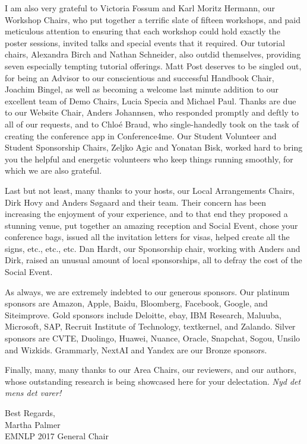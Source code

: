 I am also very grateful to Victoria Fossum and Karl Moritz Hermann, our Workshop Chairs, who put together a terrific slate of fifteen workshops, and paid meticulous attention to ensuring that each workshop could hold exactly the poster sessions, invited talks and special events that it required.  Our tutorial chairs, Alexandra Birch and Nathan Schneider, also outdid themselves, providing seven especially tempting tutorial offerings.  Matt Post deserves to be singled out, for being an Advisor to our conscientious and successful Handbook Chair, Joachim Bingel, as well as becoming a welcome last minute addition to our excellent team of Demo Chairs, Lucia Specia and Michael Paul.  Thanks are due to our Website Chair, Anders Johannsen, who responded promptly and deftly to all of our requests, and to Chloé Braud, who single-handedly took on the task of creating the conference app in Conference4me.  Our Student Volunteer and Student Sponsorship Chairs, Zeljko Agic and Yonatan Bisk, worked hard to bring you the helpful and energetic volunteers who keep things running smoothly, for which we are also grateful.

Last but not least, many thanks to your hosts, our Local Arrangements Chairs, Dirk Hovy and Anders Søgaard and their team.  Their concern has been increasing the enjoyment of your experience, and to that end they proposed a stunning venue, put together an amazing reception and Social Event, chose your conference bags, issued all the invitation letters for visas, helped create all the signs, etc., etc., etc.  Dan Hardt, our Sponsorship chair, working with Anders and Dirk, raised an unusual amount of local sponsorships, all to defray the cost of the Social Event.

As always, we are extremely indebted to our generous sponsors. Our platinum sponsors are Amazon, Apple, Baidu, Bloomberg, Facebook, Google, and Siteimprove.  Gold sponsors include Deloitte, ebay, IBM Research, Maluuba, Microsoft, SAP, Recruit Institute of Technology, textkernel, and Zalando.  Silver sponsors are CVTE, Duolingo, Huawei, Nuance, Oracle, Snapchat, Sogou, Unsilo and Wizkids. Grammarly, NextAI and Yandex are our Bronze sponsors.

Finally, many, many thanks to our Area Chairs, our reviewers, and our authors, whose outstanding research is being showcased here for your delectation. \textit{Nyd det mens det varer!}

\vspace{3em}
\noindent
Best Regards,\\
Martha Palmer\\
EMNLP 2017 General Chair



